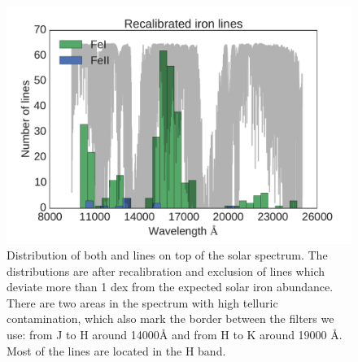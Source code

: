 \documentclass{aa}
\begin{document}
\begin{figure}[tpb]
    \centering
    \includegraphics[width=1.05\linewidth]{figures/EWvsEP_cut.pdf}
    \caption{Distribution of both  and  lines on top of the solar
    spectrum. The distributions are after recalibration and exclusion
    of lines which deviate more than 1 dex from the expected solar iron
    abundance. There are two areas in the spectrum with high telluric
    contamination, which also mark the border between the filters we
    use: from J to H around 14000\si{\angstrom} and from H to K around
    19000 \si{\angstrom}. Most of the lines are located in the H band.}
    \label{fig:Fe1_after_recal}
\end{figure}
\end{document}
